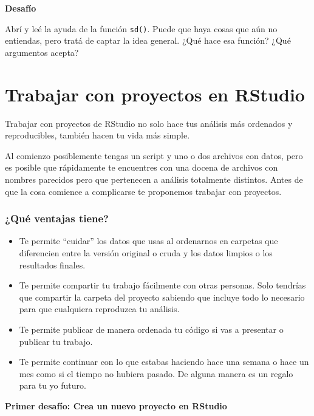 \documentclass[
  openany]{book}
\providecommand{\tightlist}{%
  \setlength{\itemsep}{0pt}\setlength{\parskip}{0pt}}
\begin{document}
\textbf{Desafío}

Abrí y leé la ayuda de la función \texttt{sd()}.
Puede que haya cosas que aún no entiendas, pero tratá de captar la idea general.
¿Qué hace esa función?
¿Qué argumentos acepta?

\hypertarget{trabajar-con-proyectos-en-rstudio}{%
\chapter{Trabajar con proyectos en RStudio}\label{trabajar-con-proyectos-en-rstudio}}

Trabajar con proyectos de RStudio no solo hace tus análisis más ordenados y reproducibles, también hacen tu vida más simple.

Al comienzo posiblemente tengas un script y uno o dos archivos con datos, pero es posible que rápidamente te encuentres con una docena de archivos con nombres parecidos pero que pertenecen a análisis totalmente distintos.
Antes de que la cosa comience a complicarse te proponemos trabajar con proyectos.

\hypertarget{quuxe9-ventajas-tiene}{%
\subsection{¿Qué ventajas tiene?}\label{quuxe9-ventajas-tiene}}

\begin{itemize}
\tightlist
\item
  Te permite ``cuidar'' los datos que usas al ordenarnos en carpetas que diferencien entre la versión original o cruda y los datos limpios o los resultados finales.
\item
  Te permite compartir tu trabajo fácilmente con otras personas. Solo tendrías que compartir la carpeta del proyecto sabiendo que incluye todo lo necesario para que cualquiera reproduzca tu análisis.
\item
  Te permite publicar de manera ordenada tu código si vas a presentar o publicar tu trabajo.
\item
  Te permite continuar con lo que estabas haciendo hace una semana o hace un mes como si el tiempo no hubiera pasado. De alguna manera es un regalo para tu yo futuro.
\end{itemize}

\textbf{Primer desafío: Crea un nuevo proyecto en RStudio}
\end{document}
